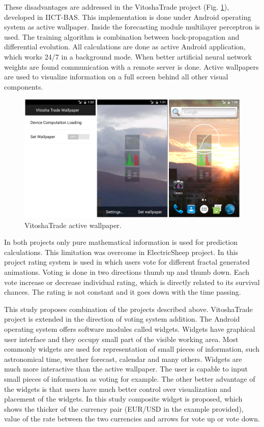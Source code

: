 \documentclass[11pt]{article}
\begin{document}
These disadvantages are addressed in the VitoshaTrade project (Fig. \ref{fig02}), developed in IICT-BAS. This implementation is done under Android operating system as active wallpaper. Inside the forecasting module multilayer perceptron is used. The training algorithm is combination between back-propagation and differential evolution. All calculations are done as active Android application, which works 24/7 in a background mode. When better artificial neural network weights are found communication with a remote server is done. Active wallpapers are used to visualize information on a full screen behind all other visual components. 

\begin{figure}
\includegraphics[width=1.0\textwidth]{fig02.png}
\centering
\caption{VitoshaTrade active wallpaper.} \label{fig02}
\end{figure}
\FloatBarrier

In both projects only pure mathematical information is used for prediction calculations. This limitation was overcome in ElectricSheep\cite{draves01} project. In this project rating system is used in which users vote for different fractal generated animations. Voting is done in two directions thumb up and thumb down. Each vote increase or decrease individual rating, which is directly related to its survival chances. The rating is not constant and it goes down with the time passing. 

This study proposes combination of the projects described above. VitoshaTrade project is extended in the direction of voting system addition. The Android operating system offers software modules called widgets. Widgets have graphical user interface and they occupy small part of the visible working area. Most commonly widgets are used for representation of small pieces of information, such astronomical time, weather forecast, calendar and many others. Widgets are much more interactive than the active wallpaper. The user is capable to input small pieces of information as voting for example. The other better advantage of the widgets is that users have much better control over visualization and placement of the widgets. In this study composite widget is proposed, which shows the thicker of the currency pair (EUR/USD in the example provided), value of the rate between the two currencies and arrows for vote up or vote down. 
\end{document}
